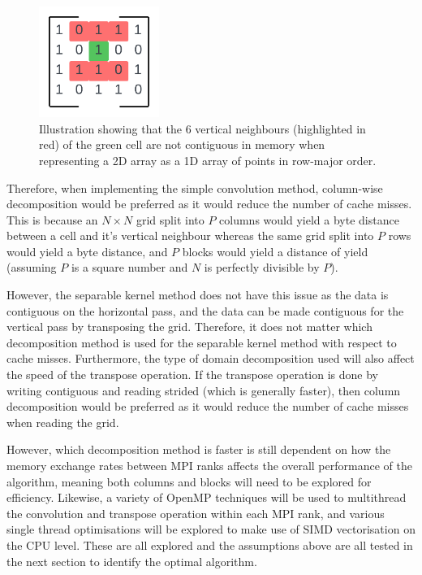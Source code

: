     \begin{figure}[htb]
    \centering
    \includegraphics[width=0.35\textwidth]{./figures/neighbour-illustration}
    \caption{Illustration showing that the 6 vertical neighbours (highlighted in red) of the green cell are not contiguous
    in memory when representing a 2D array as a 1D array of points in row-major order.}
    \label{fig:neighbour-illustration}
    \end{figure}

    Therefore, when implementing the simple convolution method, column-wise decomposition would be preferred as it would 
    reduce the number of cache misses.
    This is because an $N \times N$ grid split into $P$ columns would yield a  byte distance
    between a cell and it's vertical neighbour whereas the same grid split into $P$ rows would yield a
     byte distance, and $P$ blocks would yield a distance of yield
     (assuming $P$ is a square number and $N$ is perfectly divisible by $P$).

    However, the separable kernel method does not have this issue as the data is contiguous on the horizontal pass,
    and the data can be made contiguous for the vertical pass by transposing the grid.
    Therefore, it does not matter which decomposition method is used for the separable kernel method with respect to cache
    misses.
    Furthermore, the type of domain decomposition used will also affect the speed of the transpose operation.
    If the transpose operation is done by writing contiguous and reading strided (which is generally faster), then column
    decomposition would be preferred as it would reduce the number of cache misses when reading the grid.

    However, which decomposition method is faster is still dependent on how the memory exchange rates between MPI ranks
    affects the overall performance of the algorithm, meaning both columns and blocks will need to be explored for efficiency.
    Likewise, a variety of OpenMP techniques will be used to multithread the convolution and transpose operation within
    each MPI rank, and various single thread optimisations will be explored to make use of SIMD vectorisation on the CPU level.
    These are all explored and the assumptions above are all tested in the next section to identify the optimal algorithm.


